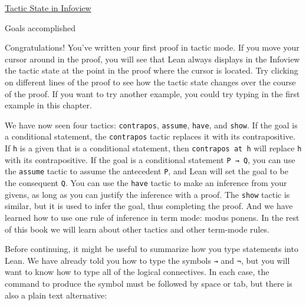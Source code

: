 \documentclass[
  letterpaper,
  DIV=11,
  numbers=noendperiod]{scrreprt}
\newenvironment{Shaded}{\begin{snugshade}}{\end{snugshade}}
\newcommand{\NormalTok}[1]{\textcolor[rgb]{0.00,0.23,0.31}{#1}}
\newcommand{\SpecialCharTok}[1]{\textcolor[rgb]{0.37,0.37,0.37}{#1}}
\renewcommand{\NormalTok}[1]{\textcolor[HTML]{000000}{#1}}
\renewcommand{\SpecialCharTok}[1]{}
\newcommand{\nobreakShaded}{\renewenvironment{Shaded}
	{\begin{tcolorbox}[frame hidden, enhanced, interior hidden, boxrule=0pt,
		borderline west={3pt}{0pt}{shadecolor}, sharp corners]}
	{\end{tcolorbox}}}
\newenvironment{outpt}
	{\nobreakShaded\begin{minipage}[t]{0.32\textwidth}}
	{\end{minipage}}
\begin{document}
\begin{outpt}

\uline{Tactic State in Infoview}

\begin{Shaded}
\begin{Highlighting}[]
\SpecialCharTok{!!}\NormalTok{Goals accomplished 🎉}
\end{Highlighting}
\end{Shaded}

\end{outpt}

Congratulations! You've written your first proof in tactic mode. If you
move your cursor around in the proof, you will see that Lean always
displays in the Infoview the tactic state at the point in the proof
where the cursor is located. Try clicking on different lines of the
proof to see how the tactic state changes over the course of the proof.
If you want to try another example, you could try typing in the first
example in this chapter.

We have now seen four tactics: \texttt{contrapos}, \texttt{assume},
\texttt{have}, and \texttt{show}. If the goal is a conditional
statement, the \texttt{contrapos} tactic replaces it with its
contrapositive. If \texttt{h} is a given that is a conditional
statement, then \texttt{contrapos\ at\ h} will replace \texttt{h} with
its contrapositive. If the goal is a conditional statement
\texttt{P\ →\ Q}, you can use the \texttt{assume} tactic to assume the
antecedent \texttt{P}, and Lean will set the goal to be the consequent
\texttt{Q}. You can use the \texttt{have} tactic to make an inference
from your givens, as long as you can justify the inference with a proof.
The \texttt{show} tactic is similar, but it is used to infer the goal,
thus completing the proof. And we have learned how to use one rule of
inference in term mode: modus ponens. In the rest of this book we will
learn about other tactics and other term-mode rules.

Before continuing, it might be useful to summarize how you type
statements into Lean. We have already told you how to type the symbols
\texttt{→} and \texttt{¬}, but you will want to know how to type all of
the logical connectives. In each case, the command to produce the symbol
must be followed by space or tab, but there is also a plain text
alternative:
\end{document}
